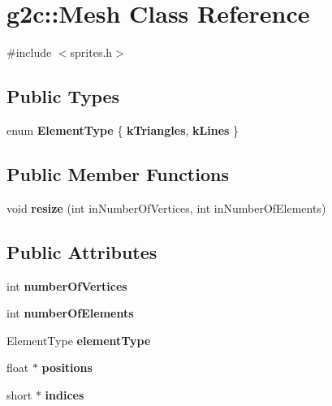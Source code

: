 \hypertarget{classg2c_1_1_mesh}{
\section{g2c::Mesh Class Reference}
\label{classg2c_1_1_mesh}
}


{\ttfamily \#include $<$sprites.h$>$}\subsection*{Public Types}
\begin{DoxyCompactItemize}
\item 
enum {\bfseries ElementType} \{ {\bfseries kTriangles}, 
{\bfseries kLines}
 \}
\end{DoxyCompactItemize}
\subsection*{Public Member Functions}
\begin{DoxyCompactItemize}
\item 
\hypertarget{classg2c_1_1_mesh_a7c28bc8c50be706d83c6e20804c2d695}{
void {\bfseries resize} (int inNumberOfVertices, int inNumberOfElements)}
\label{classg2c_1_1_mesh_a7c28bc8c50be706d83c6e20804c2d695}

\end{DoxyCompactItemize}
\subsection*{Public Attributes}
\begin{DoxyCompactItemize}
\item 
\hypertarget{classg2c_1_1_mesh_a2d68f79ca34f6a4fb8d6906e696309c2}{
int {\bfseries numberOfVertices}}
\label{classg2c_1_1_mesh_a2d68f79ca34f6a4fb8d6906e696309c2}

\item 
\hypertarget{classg2c_1_1_mesh_a6bb9fc24ca1c81bdb1c55ca59e33a8b5}{
int {\bfseries numberOfElements}}
\label{classg2c_1_1_mesh_a6bb9fc24ca1c81bdb1c55ca59e33a8b5}

\item 
\hypertarget{classg2c_1_1_mesh_a3535f7f7fe763e7958a2eb9dcadf37ff}{
ElementType {\bfseries elementType}}
\label{classg2c_1_1_mesh_a3535f7f7fe763e7958a2eb9dcadf37ff}

\item 
\hypertarget{classg2c_1_1_mesh_a02fe24297627cf19d4fb73e89753c9ea}{
float $\ast$ {\bfseries positions}}
\label{classg2c_1_1_mesh_a02fe24297627cf19d4fb73e89753c9ea}

\item 
\hypertarget{classg2c_1_1_mesh_a7ad3d1f591acca69de3df482523856ab}{
short $\ast$ {\bfseries indices}}
\label{classg2c_1_1_mesh_a7ad3d1f591acca69de3df482523856ab}

\end{DoxyCompactItemize}


